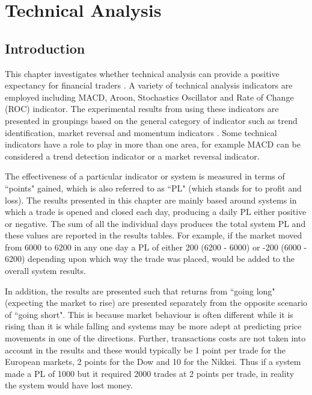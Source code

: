 
\chapter{Technical Analysis} %
 
\label{Chapter4} %


\section{Introduction}
This chapter investigates whether technical analysis can provide a positive expectancy for financial traders \citep{Kuang2014192, Hsu2010471}. A variety of technical analysis indicators are employed including MACD, Aroon, Stochastics Oscillator and Rate of Change (ROC) indicator. The experimental results from using these indicators are presented in groupings based on the general category of indicator such as trend identification, market reversal and momentum indicators \citep{Taylor2014286}. Some technical indicators have a role to play in more than one area, for example MACD can be considered a trend detection indicator or a market reversal indicator.

The effectiveness of a particular indicator or system is measured in terms of \textquotedblleft points" gained, which is also referred to as \textquotedblleft PL" (which stands for to profit and loss). The results presented in this chapter are mainly based around systems in which a trade is opened and closed each day, producing a daily PL either positive or negative. The sum of all the individual days produces the total system PL and these values are reported in the results tables. For example, if the market moved from 6000 to 6200 in any one day a PL of either 200 (6200 - 6000) or -200 (6000 - 6200) depending upon which way the trade was placed, would be added to the overall system results. 

In addition, the results are presented such that returns from \textquotedblleft going long" (expecting the market to rise) are presented separately from the opposite scenario of \textquotedblleft going short". This is because  market behaviour is often different while it is rising than it is while falling and systems may be more adept at predicting price movements in one of the directions. Further, transactions costs are not taken into account in the results and these would typically be 1 point per trade for the European markets, 2 points for the Dow and 10 for the Nikkei.  Thus if a system made a PL of 1000 but it required 2000 trades at 2 points per trade, in reality the system would have lost money. 


